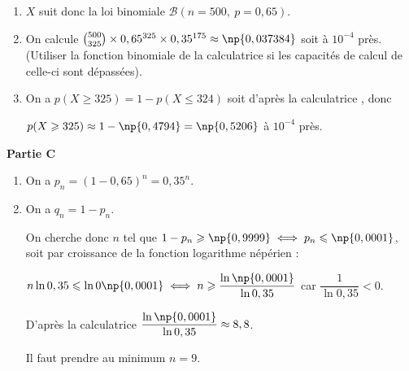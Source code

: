 \begin{enumerate}
\item %

$X$ suit donc la loi binomiale $\mathcal{B}(n = 500, \: p = 0,65)$.
\item %
On calcule $\binom{500}{325} \times 0,65^{325} \times 0,35^{175} \approx \np{0,037384}$ soit  à $10^{-4}$ près. (Utiliser la fonction binomiale de la calculatrice  si les capacités de calcul de celle-ci sont dépassées).
\item %
On a $p(X \geqslant 325) = 1 - p(X \leqslant 324)$ soit d'après la calculatrice , donc 

$p(X \geqslant 325) \approx 1 - \np{0,4794} = \np{0,5206}$ à $10^{-4}$ près.
\end{enumerate}

\textbf{Partie C}

\medskip

%
%

\medskip

\begin{enumerate}
\item %
On a $p_n = (1 - 0,65)^n = 0,35^n$.

\item On a $q_n = 1 - p_n$.

On cherche donc $n$ tel que $1 - p_n \geqslant \np{0,9999} \iff p_n \leqslant \np{0,0001}$, soit par croissance de la fonction logarithme népérien :

$n\ln 0,35 \leqslant \ln 0\np{0,0001} \iff n \geqslant \dfrac{\ln \np{0,0001}}{\ln 0,35}$ car $\dfrac{1}{\ln 0,35} < 0$.

D'après la calculatrice $\dfrac{\ln \np{0,0001}}{\ln 0,35} \approx 8,8$.

Il faut prendre au minimum $n = 9$.


\end{enumerate}


